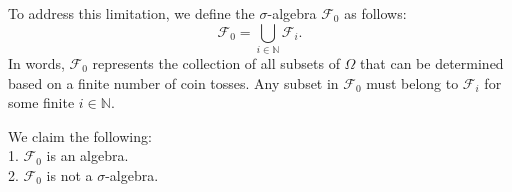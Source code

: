 To address this limitation, we define the $\sigma$-algebra $\mathcal{F}_0$ as follows:
\[
\mathcal{F}_0 = \bigcup_{i \in \mathbb{N}} \mathcal{F}_i.
\]
In words, $\mathcal{F}_0$ represents the collection of all subsets of $\Omega$ that can be determined based on a finite number of coin tosses. Any subset in $\mathcal{F}_0$ must belong to $\mathcal{F}_i$ for some finite $i \in \mathbb{N}$.\\

\begin{lemma}
    We claim the following:\\

    1. \( \mathcal{F}_0 \) is an algebra.\\
    2. \( \mathcal{F}_0 \) is not a $\sigma$-algebra.
\end{lemma}


